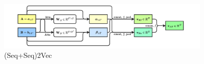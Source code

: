 \begin{figure}[htpb]
    \centering
    \includegraphics[width=0.9\textwidth]{figs/seqseq2vec.pdf}
    \caption{(Seq+Seq)2Vec}
    \label{fig:seqseq2vec}
\end{figure}